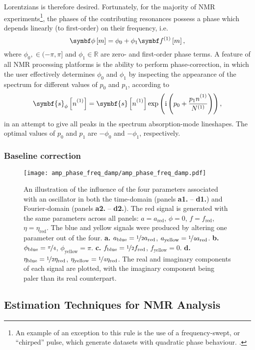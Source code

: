 Lorentzians is therefore desired. Fortunately, for the majority of \ac{NMR} experiments\footnote{
    An example of an exception to this rule is the use of a frequency-swept, or
    ``chirped'' pulse, which generate datasets with quadratic phase behaviour.
    .
}, the phases of the contributing resonances possess a phase which depends
linearly (to first-order) on their frequency, i.e.
\begin{equation}
    \bdphim = \phi_0 + \phi_1 \bdfonem,
\end{equation}
where $\phi_0, \in (-\pi, \pi]$ and $\phi_1 \in \mathbb{R}$ are zero- and
first-order phase terms. A feature of all \ac{NMR} processing platforms is the
ability to perform phase-correction, in which the user effectively determines
$\phi_0$ and $\phi_1$ by inspecting the appearance of the spectrum for
different values of $p_0$ and  $p_1$, according to
\begin{equation}
    \symbf{s}_{\phi} \left[\none\right] =
    \symbf{s} \left[\none\right]
    \exp\left(\iu \left(p_0 + \frac{p_1 \none}{\None}\right)\right),
\end{equation}
in an attempt to give all peaks in the spectrum absorption-mode lineshapes. The
optimal values of $p_0$ and  $p_1$ are $-\phi_0$ and  $-\phi_1$, respectively.

\subsubsection{Baseline correction}
\cite{Cobas2006}

\begin{figure}
    \centering
    \texttt{[image: amp\_phase\_freq\_damp/amp\_phase\_freq\_damp.pdf]}
    \caption{An illustration of the influence of the four parameters associated
        with an oscillator in both the time-domain (panels \textbf{a1.} -- \textbf{d1.}) and Fourier-domain
        (panels \textbf{a2.} -- \textbf{d2.}). The red
        signal is generated with the same parameters across all panels:
        $a = a_{\text{red}}$, $\phi = 0$, $f = f_{\text{red}}$,  $\eta =
        \eta_{\text{red}}$.
        The blue and yellow signals were produced by altering one parameter out of the four.
        \textbf{a.}
        $a_{\text{blue}} = \nicefrac{1}{2} a_{\text{red}}$,
        $a_{\text{yellow}} = \nicefrac{1}{4} a_{\text{red}}$.
        \textbf{b.}
        $\phi_{\text{blue}} = \nicefrac{\pi}{4}$,
        $\phi_{\text{yellow}} = \pi$.
        \textbf{c.}
        $f_{\text{blue}} = \nicefrac{1}{2} f_{\text{red}}$,
        $f_{\text{yellow}} = 0$.
        \textbf{d.}
        $\eta_{\text{blue}} = \nicefrac{1}{2}\eta_{\text{red}}$,
        $\eta_{\text{yellow}} = \nicefrac{1}{4}\eta_{\text{red}}$.
        The real and imaginary components of each signal are plotted, with the
        imaginary component being paler than its real counterpart.
    }
    \label{fig:amp-phase-freq-damp}
\end{figure}
\subsection{Estimation Techniques for NMR Analysis}
